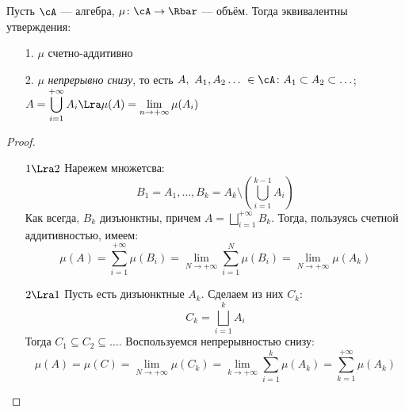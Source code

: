 \begin{theorem}
    Пусть $\cA$ --- алгебра, $\mu \colon \cA \to \Rbar$ --- объём. Тогда
    эквивалентны утверждения:
    \begin{itemize}
        \item[1.] $\mu$ счетно-аддитивно
        \item[2.] $\mu$ \textit{непрерывно снизу}, то есть
        $\displaystyle A,~A_1, A_2 \ldots~ \in \cA\colon A_1 \subset A_2 \subset \ldots$;
        $\displaystyle A = \bigcup_{i = 1}^{+\infty}{A_i} \Lra \\ \mu(A) = \lim_{n \to
        +\infty}{\mu(A_i)}$
    \end{itemize}
\end{theorem}
\begin{proof}
	\enewline
	\begin{itemize}
		\item [$1 \Lra 2$] Нарежем множетсва:
\[
	B_1 = A_1, \ldots, B_k = A_k \setminus \left(\bigcup_{i = 1}^{k - 1}{A_i}\right)
\]
	Как всегда, $B_k$ дизъюнктны, причем $A = \bigsqcup_{i = 1}^{+\infty}{B_k}$.
	Тогда, пользуясь счетной аддитивностью, имеем:
\[
	\mu(A) = \sum_{i = 1}^{+\infty}{\mu(B_i)}
	= \lim_{N \to +\infty}{\sum_{i = 1}^{N}{\mu(B_i)}}
	= \lim_{N \to +\infty}{\mu(A_k)}
\]
		\item [$2 \Lra 1$] Пусть есть дизъюнктные $A_k$. Сделаем из них $C_k$:
\[
	C_k = \bigsqcup_{i = 1}^{k}{A_i}
\]
		Тогда $C_1 \subseteq C_2 \subseteq \ldots$. Воспользуемся непрерывностью снизу:
\[
	\mu(A) = \mu(C) = \lim_{N \to +\infty}{\mu(C_k)}
	= \lim_{k \to +\infty}{\sum_{i = 1}^{k}{\mu(A_k)}}
	= \sum_{k = 1}^{+\infty}{\mu(A_k)}
\]
	\end{itemize}
\end{proof}

